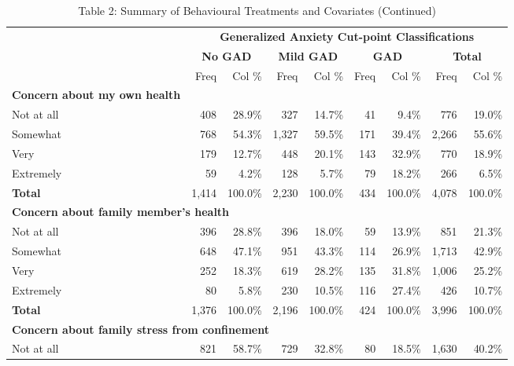 \documentclass{article}[12pt]
\begin{document}
        \begin{table}[!t]
            \centering
        \begin{threeparttable}
            \caption*{Table 2: Summary of Behavioural Treatments and Covariates (Continued)}
            \begin{tabular}{lrrrrrrrr}
                \hline
                \hline
                 & \multicolumn{8}{c}{\textbf{Generalized Anxiety Cut-point Classifications}} \\
                 & \multicolumn{2}{c}{\textbf{No GAD}} & \multicolumn{2}{c}{\textbf{Mild GAD}} & \multicolumn{2}{c}{\textbf{GAD}} & \multicolumn{2}{c}{\textbf{Total}} \\
                 \cmidrule(lr){2-3}\cmidrule(lr){4-5}\cmidrule(lr){6-7}\cmidrule(lr){8-9}
                &Freq&Col \%&Freq&Col \%&Freq&Col \%&Freq&Col \% \\
                \hline
                \textbf{Concern about my own health} &&&&&&&& \\
                Not at all&408&28.9\%&327&14.7\%&41&9.4\%&776&19.0\% \\
                Somewhat&768&54.3\%&1,327&59.5\%&171&39.4\%&2,266&55.6\% \\
                Very&179&12.7\%&448&20.1\%&143&32.9\%&770&18.9\% \\
                Extremely&59&4.2\%&128&5.7\%&79&18.2\%&266&6.5\% \\
                \textbf{Total}&1,414&100.0\%&2,230&100.0\%&434&100.0\%&4,078&100.0\% \\
                \hline
                \multicolumn{8}{l}{\bf Concern about family member's health} \\
                Not at all&396&28.8\%&396&18.0\%&59&13.9\%&851&21.3\% \\
                Somewhat&648&47.1\%&951&43.3\%&114&26.9\%&1,713&42.9\% \\
                Very&252&18.3\%&619&28.2\%&135&31.8\%&1,006&25.2\% \\
                Extremely&80&5.8\%&230&10.5\%&116&27.4\%&426&10.7\% \\
                \textbf{Total}&1,376&100.0\%&2,196&100.0\%&424&100.0\%&3,996&100.0\% \\
                \hline
                \multicolumn{8}{l}{\bf Concern about family stress from confinement} \\
                Not at all&821&58.7\%&729&32.8\%&80&18.5\%&1,630&40.2\% \\

\end{tabular}
\end{threeparttable}
\end{table}
\end{document}

